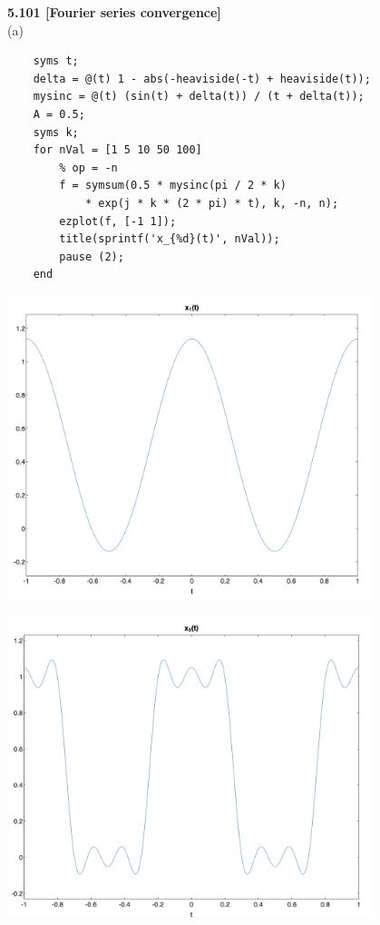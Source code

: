 \documentclass{article}
\begin{document}
\bigskip
{\bf 5.101 [Fourier series convergence]}\\
(a)
\begin{lstlisting}
    syms t;
    delta = @(t) 1 - abs(-heaviside(-t) + heaviside(t));
    mysinc = @(t) (sin(t) + delta(t)) / (t + delta(t));
    A = 0.5;
    syms k;
    for nVal = [1 5 10 50 100]
        % op = -n
        f = symsum(0.5 * mysinc(pi / 2 * k) 
            * exp(j * k * (2 * pi) * t), k, -n, n);
        ezplot(f, [-1 1]); 
        title(sprintf('x_{%d}(t)', nVal));
        pause (2);
    end
\end{lstlisting}

\begin{center}
    \includegraphics[width=0.8\textwidth]{x1.png}
\end{center}
\begin{center}
    \includegraphics[width=0.8\textwidth]{x5.png}
\end{center}
\end{document}
